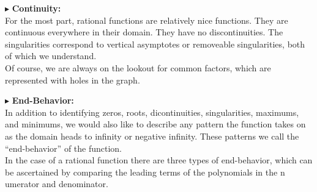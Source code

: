 \documentclass{ximera}
\begin{document}
$\blacktriangleright$ \textbf{\textcolor{red!10!blue!90!}{Continuity:}} \\
For the most part, rational functions are relatively nice functions.  They are continuous everywhere in their domain.  They have no discontinuities.  The singularities correspond to vertical asymptotes or removeable singularities, both of which we understand.  \\

Of course, we are always on the lookout for common factors, which are represented with holes in the graph.








$\blacktriangleright$ \textbf{\textcolor{red!10!blue!90!}{End-Behavior:}} \\
In addition to identifying zeros, roots, dicontinuities, singularities, maximums, and minimums, we would also like to describe any pattern the function takes on as the domain heads to infinity or negative infinity.  These patterns we call the ``end-behavior'' of the function.  \\

In the case of a rational function there are three types of end-behavior, which can be ascertained by comparing the leading terms of the polynomials in the n umerator and denominator.
\end{document}
